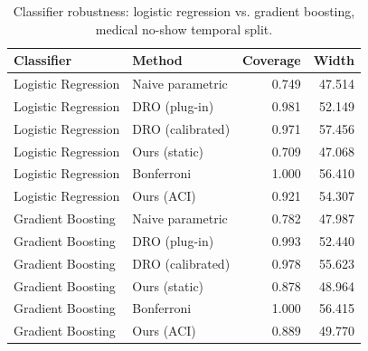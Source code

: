 \begin{table}[htbp]
\centering
\caption{Classifier robustness: logistic regression vs. gradient boosting, medical no-show temporal split.}
\label{tab:classifier-robustness}
\begin{tabular}{llrr}
\toprule
Classifier & Method & Coverage & Width \\
\midrule
Logistic Regression & Naive parametric & 0.749 & 47.514 \\
Logistic Regression & DRO (plug-in) & 0.981 & 52.149 \\
Logistic Regression & DRO (calibrated) & 0.971 & 57.456 \\
Logistic Regression & Ours (static) & 0.709 & 47.068 \\
Logistic Regression & Bonferroni & 1.000 & 56.410 \\
Logistic Regression & Ours (ACI) & 0.921 & 54.307 \\
Gradient Boosting & Naive parametric & 0.782 & 47.987 \\
Gradient Boosting & DRO (plug-in) & 0.993 & 52.440 \\
Gradient Boosting & DRO (calibrated) & 0.978 & 55.623 \\
Gradient Boosting & Ours (static) & 0.878 & 48.964 \\
Gradient Boosting & Bonferroni & 1.000 & 56.415 \\
Gradient Boosting & Ours (ACI) & 0.889 & 49.770 \\
\bottomrule
\end{tabular}
\end{table}
